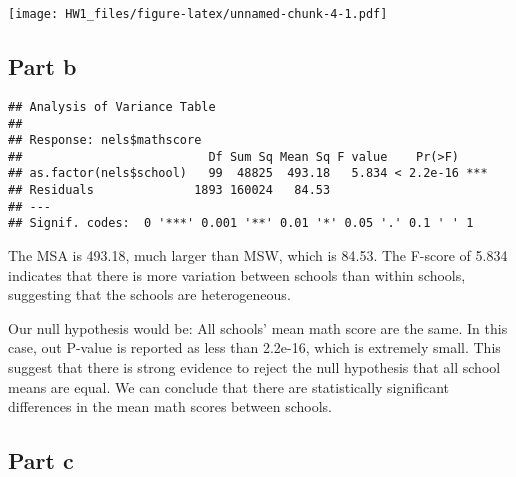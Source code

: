 \documentclass[
]{article}
\newenvironment{Shaded}{\begin{snugshade}}{\end{snugshade}}
\newcommand{\AttributeTok}[1]{\textcolor[rgb]{0.13,0.29,0.53}{#1}}
\newcommand{\CommentTok}[1]{\textcolor[rgb]{0.56,0.35,0.01}{\textit{#1}}}
\newcommand{\FunctionTok}[1]{\textcolor[rgb]{0.13,0.29,0.53}{\textbf{#1}}}
\newcommand{\NormalTok}[1]{#1}
\newcommand{\OtherTok}[1]{\textcolor[rgb]{0.56,0.35,0.01}{#1}}
\newcommand{\SpecialCharTok}[1]{\textcolor[rgb]{0.81,0.36,0.00}{\textbf{#1}}}
\newcommand{\StringTok}[1]{\textcolor[rgb]{0.31,0.60,0.02}{#1}}
\begin{document}
\texttt{[image: HW1\_files/figure-latex/unnamed-chunk-4-1.pdf]}

\hypertarget{part-b}{%
\subsection{Part b}\label{part-b}}

\begin{Shaded}
\end{Shaded}

\begin{verbatim}
## Analysis of Variance Table
## 
## Response: nels$mathscore
##                          Df Sum Sq Mean Sq F value    Pr(>F)    
## as.factor(nels$school)   99  48825  493.18   5.834 < 2.2e-16 ***
## Residuals              1893 160024   84.53                      
## ---
## Signif. codes:  0 '***' 0.001 '**' 0.01 '*' 0.05 '.' 0.1 ' ' 1
\end{verbatim}

The MSA is 493.18, much larger than MSW, which is 84.53. The F-score of
5.834 indicates that there is more variation between schools than within
schools, suggesting that the schools are heterogeneous.

Our null hypothesis would be: All schools' mean math score are the same.
In this case, out P-value is reported as less than 2.2e-16, which is
extremely small. This suggest that there is strong evidence to reject
the null hypothesis that all school means are equal. We can conclude
that there are statistically significant differences in the mean math
scores between schools.

\hypertarget{part-c}{%
\subsection{Part c}\label{part-c}}

\begin{Shaded}
\end{Shaded}
\end{document}
